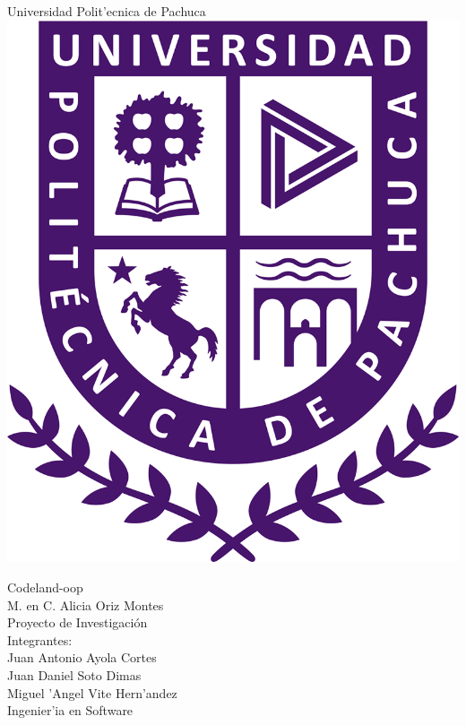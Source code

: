 \begin{titlepage}
	\begin{center}
		\sc \LARGE Universidad Polit'ecnica de Pachuca\\
		\bigskip
		\includegraphics[scale=0.2]{img/logo.png}
	\end{center}
	\bigskip
	\begin{center}
		\huge{Codeland-oop\\}
		\vspace*{1cm}
		\sc \LARGE M. en C. Alicia Oriz Montes\\
		\vspace*{0.5cm}
		\sc \LARGE Proyecto de Investigación\\
		\vspace*{0.5cm}
		\sc \LARGE Integrantes: \\
	    \sc \Large Juan Antonio Ayola Cortes \\
	    \sc \Large Juan Daniel Soto Dimas \\
		\sc \Large Miguel 'Angel Vite Hern'andez \\
		\vfill
		\sc Ingenier'ia en Software
	\end{center}
\end{titlepage}